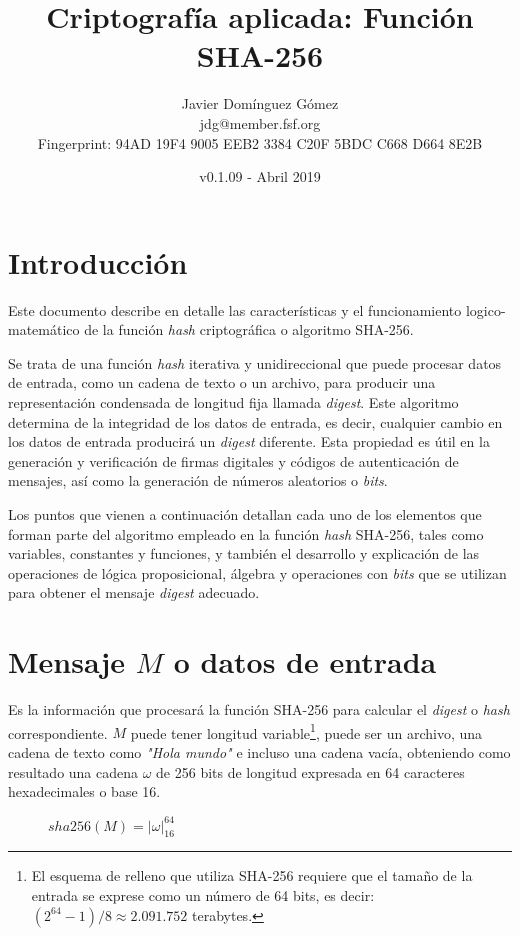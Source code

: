 \documentclass{article}
\title{\textbf{Criptografía aplicada: Función SHA-256}}
\author{Javier Domínguez Gómez \\
\small{jdg@member.fsf.org} \\
\small{Fingerprint: 94AD 19F4 9005 EEB2 3384 C20F 5BDC C668 D664 8E2B}}
\date{v0.1.09 - Abril 2019}
\begin{document}
\maketitle

\tableofcontents{}

\section{Introducción}
    Este documento describe en detalle las características y el funcionamiento logico-matemático de la función \textit{hash} criptográfica o algoritmo SHA-256.
    
    \vspace{3mm}
    Se trata de una función \textit{hash} iterativa y unidireccional que puede procesar datos de entrada, como un cadena de texto o un archivo, para producir una representación condensada de longitud fija llamada \textit{digest}. Este algoritmo determina de la integridad de los datos de entrada, es decir, cualquier cambio en los datos de entrada producirá un \textit{digest} diferente. Esta propiedad es útil en la generación y verificación de firmas digitales y códigos de autenticación de mensajes, así como la generación de números aleatorios o \textit{bits}.
    
    \vspace{3mm}
    Los puntos que vienen a continuación detallan cada uno de los elementos que forman parte del algoritmo empleado en la función \textit{hash} SHA-256, tales como variables, constantes y funciones, y también el desarrollo y explicación de las operaciones de lógica proposicional, álgebra y operaciones con \textit{bits} que se utilizan para obtener el mensaje \textit{digest} adecuado.

\section{Mensaje $M$ o datos de entrada}
    Es la información que procesará la función SHA-256 para calcular el \textit{digest} o \textit{hash} correspondiente. $M$ puede tener longitud variable\footnote{El esquema de relleno que utiliza SHA-256 requiere que el tamaño de la entrada se exprese como un número de 64 bits, es decir: $(2^{64}-1)/8 \approx 2.091.752$ terabytes.}, puede ser un archivo, una cadena de texto como \textit{"Hola mundo"} e incluso una cadena vacía, obteniendo como resultado una cadena $\omega$ de 256 bits de longitud expresada en 64 caracteres hexadecimales o base 16.
        \begin{figure}[H]
        \centering
            $sha256(M) = |\omega|^{64}_{16}$
        \end{figure}
        
\end{document}
